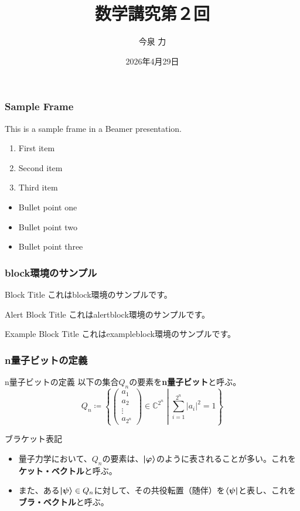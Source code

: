 \documentclass[9pt]{beamer}
\title{数学講究第２回}
\author{今泉 力}
\date{2026年4月29日}
\begin{document}
\begin{frame}
  \titlepage
\end{frame}

\begin{frame}
  \frametitle{Sample Frame}
  This is a sample frame in a Beamer presentation.
  \begin{enumerate}
    \item First item
    \item Second item
    \item Third item
  \end{enumerate}
  \begin{itemize}
    \item Bullet point one
    \item Bullet point two
    \item Bullet point three
  \end{itemize}
\end{frame}

\begin{frame}
  \frametitle{block環境のサンプル}
  \begin{block}{Block Title}
    これはblock環境のサンプルです。
  \end{block}
  \begin{alertblock}{Alert Block Title}
    これはalertblock環境のサンプルです。
  \end{alertblock}
  \begin{exampleblock}{Example Block Title}
    これはexampleblock環境のサンプルです。
  \end{exampleblock}
\end{frame}


\begin{frame}
  \frametitle{n量子ビットの定義}
  \begin{block}{n量子ビットの定義}
    以下の集合$Q_{n}$の要素を\textbf{n量子ビット}と呼ぶ。
    \[
    Q_n \coloneq \left\{ \begin{pmatrix}a_1 \\ a_2 \\ \vdots \\ a_{2^n} \end{pmatrix} \in \mathbb{C}^{2^n} \middle| \sum_{i=1}^{2^n} |a_i|^2 = 1 \right\}
    \]
  \end{block}
  \begin{block}{ブラケット表記}
    \begin{itemize}
      \item 量子力学において、$Q_n$の要素は、$\bm{\ket{\varphi}}$のように表されることが多い。これを\textbf{ケット・ベクトル}と呼ぶ。
      \item また、ある$\bm{\ket{\psi}} \in Q_n$に対して、その共役転置（随伴）を$\bm{\bra{\psi}}$と表し、これを\textbf{ブラ・ベクトル}と呼ぶ。
    \end{itemize}
  \end{block}
\end{frame}
\end{document}
